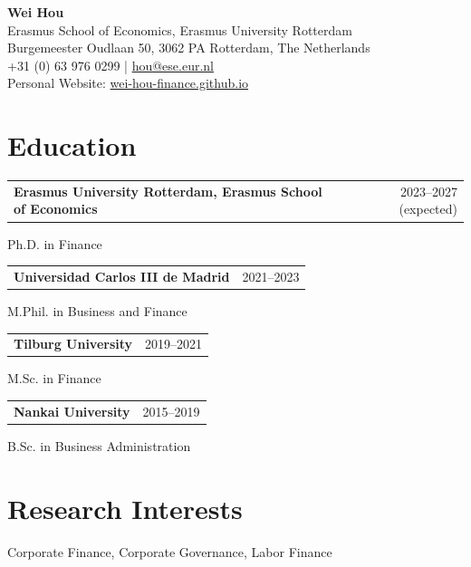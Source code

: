 \documentclass[11pt,letterpaper]{article}
\makeatletter
\newenvironment{cvbody}{\begin{list}{}{\setlength{\leftmargin}{1.4em}\setlength{\rightmargin}{0pt}\setlength{\topsep}{0pt}\setlength{\parsep}{4pt}}\item[]}{\end{list}}
\newcommand{\dated}[2]{\noindent\begin{tabularx}{\linewidth}{@{}Xr@{}}#1 & #2\end{tabularx}\par}
\makeatother
\begin{document}
\begin{center}
{\LARGE\bfseries Wei Hou}\\[7pt]
Erasmus School of Economics, Erasmus University Rotterdam\\
Burgemeester Oudlaan 50, 3062 PA Rotterdam, The Netherlands\\
\quad +31 (0) 63 976 0299 | \href{mailto:hou@ese.eur.nl}{hou@ese.eur.nl}\\
Personal Website: \href{https://wei-hou-finance.github.io/}{wei-hou-finance.github.io}
\end{center}

\section*{Education}
\begin{cvbody}
\dated{\textbf{Erasmus University Rotterdam, Erasmus School of Economics}}{2023--2027 (expected)}
Ph.D. in Finance
\par\vspace{3pt}
\dated{\textbf{Universidad Carlos III de Madrid}}{2021--2023}
M.Phil. in Business and Finance
\par\vspace{3pt}
\dated{\textbf{Tilburg University}}{2019--2021}
M.Sc. in Finance
\par\vspace{3pt}
\dated{\textbf{Nankai University}}{2015--2019}
B.Sc. in Business Administration
\end{cvbody}


\section*{Research Interests}
\begin{cvbody}
Corporate Finance, Corporate Governance, Labor Finance
\end{cvbody}
\end{document}
